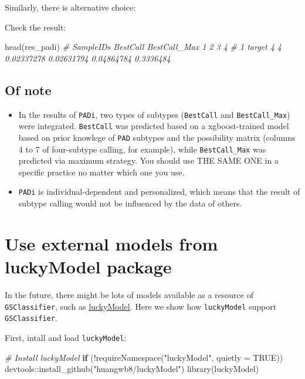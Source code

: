 \documentclass[
  12pt,
]{book}
\newenvironment{Shaded}{\begin{snugshade}}{\end{snugshade}}
\newcommand{\AttributeTok}[1]{\textcolor[rgb]{0.77,0.63,0.00}{#1}}
\newcommand{\CommentTok}[1]{\textcolor[rgb]{0.56,0.35,0.01}{\textit{#1}}}
\newcommand{\ConstantTok}[1]{\textcolor[rgb]{0.00,0.00,0.00}{#1}}
\newcommand{\ControlFlowTok}[1]{\textcolor[rgb]{0.13,0.29,0.53}{\textbf{#1}}}
\newcommand{\FunctionTok}[1]{\textcolor[rgb]{0.00,0.00,0.00}{#1}}
\newcommand{\NormalTok}[1]{#1}
\newcommand{\SpecialCharTok}[1]{\textcolor[rgb]{0.00,0.00,0.00}{#1}}
\newcommand{\StringTok}[1]{\textcolor[rgb]{0.31,0.60,0.02}{#1}}
\begin{document}
Similarly, there is alternative choice:

Check the result:

\begin{Shaded}
\begin{Highlighting}[]
\FunctionTok{head}\NormalTok{(res\_padi)}
\CommentTok{\#   SampleIDs BestCall BestCall\_Max          1          2          3         4}
\CommentTok{\# 1    target        4            4 0.02337278 0.02631794 0.04864784 0.3336484}
\end{Highlighting}
\end{Shaded}

\hypertarget{of-note-1}{%
\subsection{Of note}\label{of-note-1}}

\begin{itemize}
\item
  In the results of \texttt{PADi}, two types of subtypes (\texttt{BestCall} and \texttt{BestCall\_Max}) were integrated. \texttt{BestCall} was predicted based on a xgboost-trained model based on prior knowlege of \texttt{PAD} subtypes and the possibility matrix (columns 4 to 7 of four-subtype calling, for example), while \texttt{BestCall\_Max} was predicted via maximum strategy. You should use THE SAME ONE in a specific practice no matter which one you use.
\item
  \texttt{PADi} is individual-dependent and personalized, which means that the result of subtype calling would not be influenced by the data of others.
\end{itemize}

\hypertarget{use-external-models-from-luckymodel-package}{%
\section{Use external models from luckyModel package}\label{use-external-models-from-luckymodel-package}}

In the future, there might be lots of models available as a resource of \texttt{GSClassifier}, such as \href{https://github.com/huangwb8/luckyModel}{luckyModel}. Here we show how \texttt{luckyModel} support \texttt{GSClassifier}.

First, intall and load \texttt{luckyModel}:

\begin{Shaded}
\begin{Highlighting}[]
\CommentTok{\# Install luckyModel}
\ControlFlowTok{if}\NormalTok{ (}\SpecialCharTok{!}\FunctionTok{requireNamespace}\NormalTok{(}\StringTok{"luckyModel"}\NormalTok{, }\AttributeTok{quietly =} \ConstantTok{TRUE}\NormalTok{))}
\NormalTok{    devtools}\SpecialCharTok{::}\FunctionTok{install\_github}\NormalTok{(}\StringTok{"huangwb8/luckyModel"}\NormalTok{)}
\FunctionTok{library}\NormalTok{(luckyModel)}
\end{Highlighting}
\end{Shaded}
\end{document}

